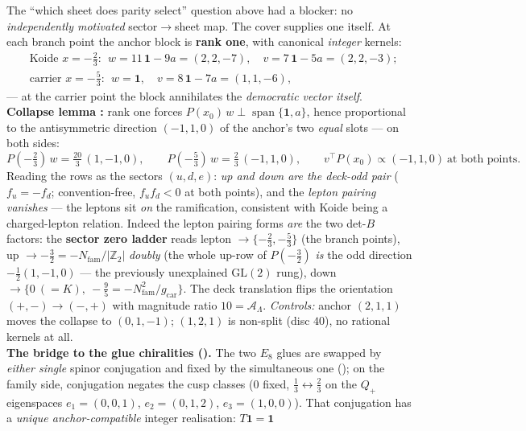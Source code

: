 \documentclass[11pt,a4paper]{article}
\newcommand{\gcar}{g_{\mathrm{car}}}
\newcommand{\Nfam}{N_{\mathrm{fam}}}
\newcommand{\AL}{\mathcal A_\Lambda}
\newcommand{\Z}{\mathbb{Z}}
\theoremstyle{definition}
\begin{document}
\begin{keybox}
The ``which sheet does parity select'' question above had a blocker: no \emph{independently motivated}
sector$\to$sheet map. The cover supplies one itself. At each branch point the anchor block is \textbf{rank
one}, with canonical \emph{integer} kernels:
\[
\begin{aligned}
  &\text{Koide } x=-\tfrac23:\ \ w=11\,\mathbf1-9a=(2,2,-7),\quad v=7\,\mathbf1-5a=(2,2,-3);\\
  &\text{carrier } x=-\tfrac53:\ \ w=\mathbf 1,\quad v=8\,\mathbf1-7a=(1,1,-6),
\end{aligned}
\]
--- at the carrier point the block annihilates the \emph{democratic vector itself}. \textbf{Collapse lemma
\mE:} rank one forces $P(x_0)\,w\perp\operatorname{span}\{\mathbf1,a\}$, hence proportional to the
antisymmetric direction $(-1,1,0)$ of the anchor's two \emph{equal} slots --- on both sides:
\[
  P(-\tfrac23)\,w=\tfrac{20}{3}\,(1,-1,0),\qquad P(-\tfrac53)\,w=\tfrac23\,(-1,1,0),\qquad
  v^\top P(x_0)\propto(-1,1,0)\ \text{at both points} .
\]
Reading the rows as the sectors $(u,d,e)$: \emph{up and down are the deck-odd pair} ($f_u=-f_d$;
convention-free, $f_uf_d<0$ at both points), and the \emph{lepton pairing vanishes} --- the leptons sit
\emph{on} the ramification, consistent with Koide being a charged-lepton relation. Indeed the lepton
pairing forms \emph{are} the two det-$B$ factors: the \textbf{sector zero ladder} reads
lepton $\to\{-\tfrac23,-\tfrac53\}$ (the branch points), up $\to-\tfrac32=-\Nfam/|\Z_2|$ \emph{doubly}
(the whole up-row of $P(-\tfrac32)$ \emph{is} the odd direction $-\tfrac12(1,-1,0)$ --- the previously
unexplained $\mathrm{GL}(2)$ rung), down $\to\{0\ (=K),\ -\tfrac95=-\Nfam^2/\gcar\}$. The deck translation
flips the orientation $(+,-)\to(-,+)$ with magnitude ratio $10=\AL$. \emph{Controls:} anchor $(2,1,1)$
moves the collapse to $(0,1,-1)$; $(1,2,1)$ is non-split (disc $40$), no rational kernels at all.
\smallskip\\
\noindent\textbf{The bridge to the glue chiralities ().} The two
$E_8$ glues are swapped by \emph{either single} spinor conjugation and fixed by the simultaneous one
(); on the family side, conjugation negates the cusp classes
($0$ fixed, $\tfrac13\leftrightarrow\tfrac23$ on the $Q_+$ eigenspaces $e_1=(0,0,1)$, $e_2=(0,1,2)$,
$e_3=(1,0,0)$). That conjugation has a \emph{unique anchor-compatible} integer realisation: $T\mathbf1=\mathbf1$

\end{keybox}
\end{document}
